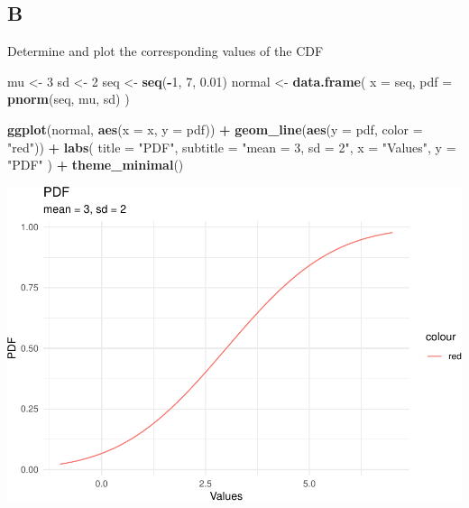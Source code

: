 \documentclass[
]{article}
\newenvironment{Shaded}{\begin{snugshade}}{\end{snugshade}}
\newcommand{\DataTypeTok}[1]{\textcolor[rgb]{0.13,0.29,0.53}{#1}}
\newcommand{\DecValTok}[1]{\textcolor[rgb]{0.00,0.00,0.81}{#1}}
\newcommand{\FloatTok}[1]{\textcolor[rgb]{0.00,0.00,0.81}{#1}}
\newcommand{\KeywordTok}[1]{\textcolor[rgb]{0.13,0.29,0.53}{\textbf{#1}}}
\newcommand{\NormalTok}[1]{#1}
\newcommand{\OperatorTok}[1]{\textcolor[rgb]{0.81,0.36,0.00}{\textbf{#1}}}
\newcommand{\StringTok}[1]{\textcolor[rgb]{0.31,0.60,0.02}{#1}}
\begin{document}
\hypertarget{b-1}{%
\subsection{B}\label{b-1}}

Determine and plot the corresponding values of the CDF

\begin{Shaded}
\begin{Highlighting}[]
\NormalTok{mu \textless{}{-}}\StringTok{ }\DecValTok{3}
\NormalTok{sd \textless{}{-}}\StringTok{ }\DecValTok{2}
\NormalTok{seq \textless{}{-}}\StringTok{ }\KeywordTok{seq}\NormalTok{(}\OperatorTok{{-}}\DecValTok{1}\NormalTok{, }\DecValTok{7}\NormalTok{, }\FloatTok{0.01}\NormalTok{)}
\NormalTok{normal \textless{}{-}}\StringTok{ }\KeywordTok{data.frame}\NormalTok{(}
  \DataTypeTok{x =}\NormalTok{ seq,}
  \DataTypeTok{pdf =} \KeywordTok{pnorm}\NormalTok{(seq, mu, sd)}
\NormalTok{)}

\KeywordTok{ggplot}\NormalTok{(normal, }\KeywordTok{aes}\NormalTok{(}\DataTypeTok{x =}\NormalTok{ x, }\DataTypeTok{y =}\NormalTok{ pdf)) }\OperatorTok{+}
\StringTok{  }\KeywordTok{geom\_line}\NormalTok{(}\KeywordTok{aes}\NormalTok{(}\DataTypeTok{y =}\NormalTok{ pdf, }\DataTypeTok{color =} \StringTok{"red"}\NormalTok{)) }\OperatorTok{+}
\StringTok{  }\KeywordTok{labs}\NormalTok{(}
    \DataTypeTok{title =} \StringTok{"PDF"}\NormalTok{,}
    \DataTypeTok{subtitle =} \StringTok{"mean = 3, sd = 2"}\NormalTok{,}
    \DataTypeTok{x =} \StringTok{"Values"}\NormalTok{,}
    \DataTypeTok{y =} \StringTok{"PDF"}
\NormalTok{  ) }\OperatorTok{+}
\StringTok{  }\KeywordTok{theme\_minimal}\NormalTok{()}
\end{Highlighting}
\end{Shaded}

\includegraphics{es_files/figure-latex/unnamed-chunk-8-1.pdf}
\end{document}
